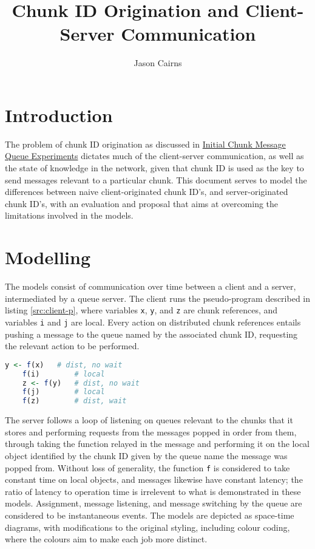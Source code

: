 \documentclass[a4paper,10pt]{article}
\begin{document}
\title{Chunk ID Origination and Client-Server Communication}
\author{Jason Cairns}
  
\maketitle{}

\section{Introduction}

The problem of chunk ID origination as discussed in
\href{init-chunk-msg-q-exp.pdf}{Initial Chunk Message Queue Experiments}
dictates much of the client-server communication, as well as the state of
knowledge in the network, given that chunk ID is used as the key to send
messages relevant to a particular chunk.
This document serves to model the differences between naive client-originated
chunk ID's, and server-originated chunk ID's, with an evaluation and proposal
that aims at overcoming the limitations involved in the models.

\section{Modelling}\label{sec:cid-model}

The models consist of communication over time between a client and a server,
intermediated by a queue server.
The client runs the pseudo-program described in listing \ref{src:client-p},
where variables \texttt{x}, \texttt{y}, and \texttt{z} are chunk references,
and variables \texttt{i} and \texttt{j} are local. 
Every action on distributed chunk references entails pushing a  message to the
queue named by the associated chunk ID, requesting the relevant action to be
performed.

\begin{lstlisting}[language=R, float, 
caption={Modelled Client Program}, label=src:client-p]
	y <- f(x)	# dist, no wait
	f(i)		# local
	z <- f(y)	# dist, no wait
	f(j)		# local
	f(z)		# dist, wait
\end{lstlisting}

The server follows a loop of listening on queues relevant to the chunks that it
stores and performing requests from the messages popped in order from them,
through taking the function relayed in the message and performing it on the
local object identified by the chunk ID given by the queue name the message was
popped from.
Without loss of generality, the function \texttt{f} is considered to take
constant time on local objects, and messages likewise have constant latency;
the ratio of latency to operation time is irrelevent to what is demonstrated in
these models.
Assignment, message listening, and message switching by the queue are
considered to be instantaneous events.
The models are depicted as space-time diagrams, with modifications to the
original styling\cite{lamport1978ordering}, including colour coding, where the
colours aim to make each job more distinct.
\end{document}
